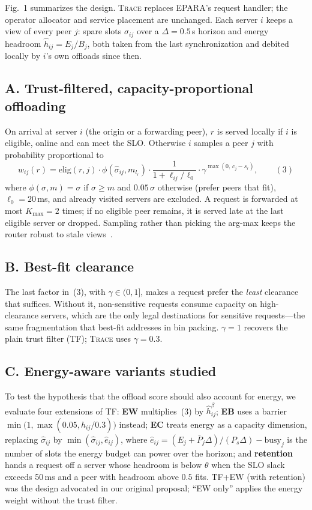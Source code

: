 \documentclass{article}
\newcommand{\sys}{\textsc{Trace}}
\begin{document}
Fig.~1 summarizes the design. \sys{} replaces EPARA's request handler; the operator allocator and service placement are unchanged. Each server $i$ keeps a view of every peer $j$: spare slots $\hat\sigma_{ij}$ over a $\Delta=0.5$\,s horizon and energy headroom $\hat h_{ij}=E_j/B_j$, both taken from the last synchronization and debited locally by $i$'s own offloads since then.

\subsection*{A. Trust-filtered, capacity-proportional offloading}
On arrival at server $i$ (the origin or a forwarding peer), $r$ is served locally if $i$ is eligible, online and can meet the SLO. Otherwise $i$ samples a peer $j$ with probability proportional to
\[ w_{ij}(r)=\mathrm{elig}(r,j)\cdot\phi(\hat\sigma_{ij},m_{l_r})\cdot\frac{1}{1+\ell_{ij}/\ell_0}\cdot\gamma^{\max(0,\,c_j-s_r)}, \qquad (3) \]
where $\phi(\sigma,m)=\sigma$ if $\sigma\ge m$ and $0.05\,\sigma$ otherwise (prefer peers that fit), $\ell_0=20$\,ms, and already visited servers are excluded. A request is forwarded at most $K_{\max}=2$ times; if no eligible peer remains, it is served late at the last eligible server or dropped. Sampling rather than picking the arg-max keeps the router robust to stale views~\cite{mitzenmacher2000old}.

\subsection*{B. Best-fit clearance}
The last factor in~(3), with $\gamma\in(0,1]$, makes a request prefer the \emph{least} clearance that suffices. Without it, non-sensitive requests consume capacity on high-clearance servers, which are the only legal destinations for sensitive requests---the same fragmentation that best-fit addresses in bin packing. $\gamma=1$ recovers the plain trust filter (TF); \sys{} uses $\gamma=0.3$.

\subsection*{C. Energy-aware variants studied}
To test the hypothesis that the offload score should also account for energy, we evaluate four extensions of TF:
\textbf{EW} multiplies~(3) by $\hat h_{ij}^{\beta}$;
\textbf{EB} uses a barrier $\min\!\big(1,\max(0.05,\hat h_{ij}/0.3)\big)$ instead;
\textbf{EC} treats energy as a capacity dimension, replacing $\hat\sigma_{ij}$ by $\min(\hat\sigma_{ij},\hat e_{ij})$, where $\hat e_{ij}=(E_j+\bar P_j\Delta)/(P_s\Delta)-\text{busy}_j$ is the number of slots the energy budget can power over the horizon; and
\textbf{retention} hands a request off a server whose headroom is below $\theta$ when the SLO slack exceeds 50\,ms and a peer with headroom above $0.5$ fits.
TF+EW (with retention) was the design advocated in our original proposal; ``EW only'' applies the energy weight without the trust filter.
\end{document}
